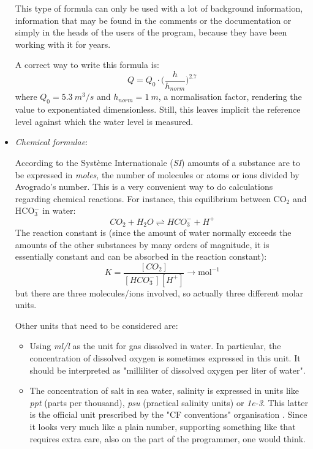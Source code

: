 \documentclass{article}
\begin{document}
\begin{itemize}
This type of formula can only be used with a lot of background information, information that may be found in the
comments or the documentation or simply in the heads of the users of the program, because they have been working with
it for years.

A correct way to write this formula is:
%
\begin{equation}
    Q = Q_0 \cdot \bigl (\frac{h}{h_{norm}} \bigr)^{2.7}
\end{equation}
%
\noindent where $Q_0 = 5.3~m^3/s$ and $h_{norm} = 1~m$, a normalisation factor, rendering the value to exponentiated
dimensionless. Still, this leaves implicit the reference level against which the water level is measured.

\item
\emph{Chemical formulae}:

According to the Syst\`eme Internationale (\emph{SI}) amounts of a substance are to be expressed in \emph{moles}, the number of molecules or atoms
or ions divided by Avogrado's number. This is a very convenient way to do calculations regarding chemical reactions.
For instance, this equilibrium between CO$_2$ and HCO$_3^-$ in water:
\begin{equation}
    CO_2 + H_2O \rightleftharpoons HCO_3^- + H^+
\end{equation}
%
The reaction constant is (since the amount of water normally exceeds the amounts of the other substances by many
orders of magnitude, it is essentially constant and can be absorbed in the reaction constant):
\begin{equation}
    K = \frac{[CO_2]}{[HCO_3^-][H^+]} \rightarrow \textrm{mol}^{-1}
\end{equation}
%
\noindent but there are three molecules/ions involved, so actually three different molar units.

Other units that need to be considered are:
\begin{itemize}
\item
Using \emph{ml/l} as the unit for gas dissolved in water. In particular, the concentration of dissolved oxygen is
sometimes expressed in this unit. It should be interpreted as "milliliter of dissolved oxygen per liter of water".
\item
The concentration of salt in sea water, salinity is expressed in units like \emph{ppt} (parts per thousand), \emph{psu}
(practical salinity units) or \emph{1e-3}. This latter is the official unit prescribed by the "CF conventions" organisation
\cite{CFConventionsStandardNames}.
Since it looks very much like a plain number, supporting something like that requires extra care, also on the part of
the programmer, one would think.
\end{itemize}


\end{itemize}
\end{document}
